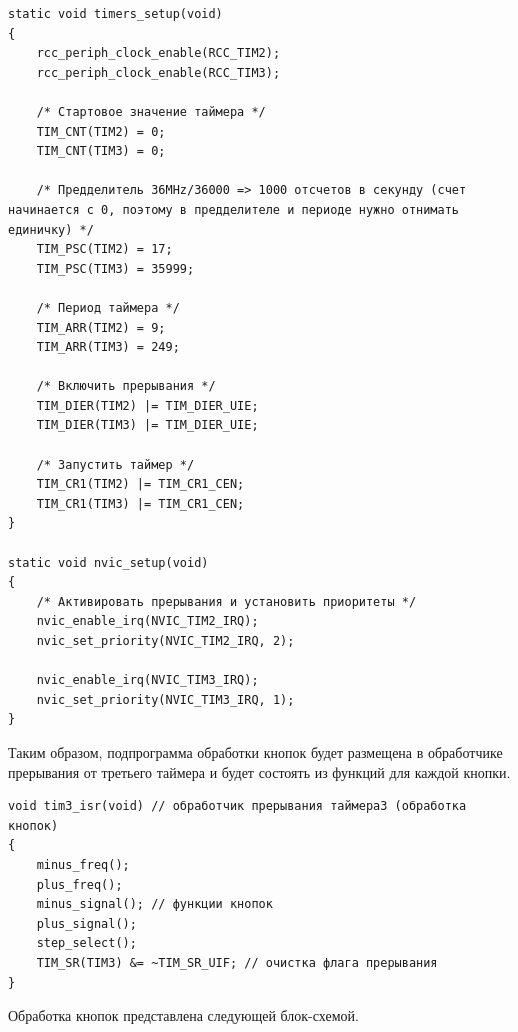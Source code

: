 \begin{code}
\begin{verbatim}
static void timers_setup(void)
{
    rcc_periph_clock_enable(RCC_TIM2);
    rcc_periph_clock_enable(RCC_TIM3);

    /* Стартовое значение таймера */
    TIM_CNT(TIM2) = 0;
    TIM_CNT(TIM3) = 0;

    /* Предделитель 36MHz/36000 => 1000 отсчетов в секунду (счет начинается с 0, поэтому в предделителе и периоде нужно отнимать единичку) */
    TIM_PSC(TIM2) = 17;
    TIM_PSC(TIM3) = 35999;

    /* Период таймера */
    TIM_ARR(TIM2) = 9;
    TIM_ARR(TIM3) = 249;

    /* Включить прерывания */
    TIM_DIER(TIM2) |= TIM_DIER_UIE;
    TIM_DIER(TIM3) |= TIM_DIER_UIE;

    /* Запустить таймер */
    TIM_CR1(TIM2) |= TIM_CR1_CEN;
    TIM_CR1(TIM3) |= TIM_CR1_CEN;
}

static void nvic_setup(void)
{
    /* Активировать прерывания и установить приоритеты */
    nvic_enable_irq(NVIC_TIM2_IRQ);
    nvic_set_priority(NVIC_TIM2_IRQ, 2);

    nvic_enable_irq(NVIC_TIM3_IRQ);
    nvic_set_priority(NVIC_TIM3_IRQ, 1);
}
\end{verbatim}
\end{code}

	
	Таким образом, подпрограмма обработки кнопок будет размещена в обработчике прерывания от третьего таймера и будет состоять из функций для каждой кнопки.
	
	
\begin{code}
\begin{verbatim}
void tim3_isr(void) // обработчик прерывания таймера3 (обработка кнопок)
{
    minus_freq();
    plus_freq();
    minus_signal(); // функции кнопок
    plus_signal();
    step_select();
    TIM_SR(TIM3) &= ~TIM_SR_UIF; // очистка флага прерывания
}
\end{verbatim}
\end{code}

	Обработка кнопок представлена следующей блок-схемой.	
	
